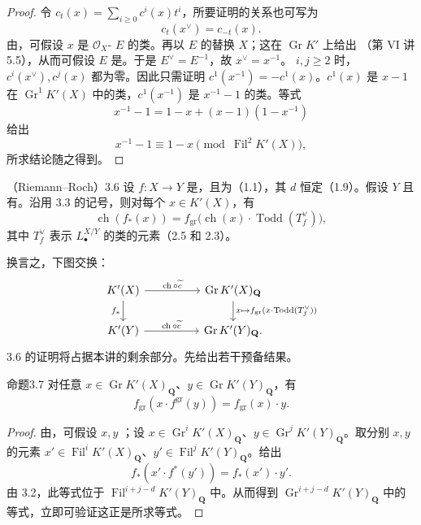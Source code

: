 \begin{proof}
令 $c_t(x)=\sum_{i\geq0}c^i(x)t^i$，所要证明的关系也可写为
\[c_t(x^\vee)=c_{-t}(x).\]
由，可假设 $x$ 是 $\mathscr O_X$- $E$ 的类。再以 $E$ 的替换 $X$；这在 $\operatorname{Gr}K'$ 上给出
（第 VI 讲 5.5），从而可假设 $E$ 是。于是 $E^\vee=E^{-1}$，故 $x^\vee=x^{-1}$。
$i,j\geq2$ 时，$c^i(x^\vee),c^j(x)$ 都为零。因此只需证明 $c^1(x^{-1})=-c^1(x)$。$c^1(x)$ 是 $x-1$ 在 $\operatorname{Gr}^1K'(X)$ 中的类，$c^1(x^{-1})$ 是 $x^{-1}-1$ 的类。等式
\[x^{-1}-1=1-x+(x-1)(1-x^{-1})\]
给出
\[x^{-1}-1\equiv1-x\pmod{\operatorname{Fil}^2K'(X)},\]
所求结论随之得到。
\end{proof}
\begin{SGAresult}{（Riemann--Roch）}{3.6}
设 $f:X\to Y$ 是，且为（1.1），其 $d$ 恒定（1.9）。假设 $Y$ 且有。沿用 3.3 的记号，则对每个 $x\in K'(X)$，有
\[\operatorname{ch}(f_*(x))=f_{\mathrm{gr}}\bigl(\operatorname{ch}(x)\cdot\operatorname{Todd}(T_f^\vee)\bigr),\]
其中 $T_f^\vee$ 表示 $L^{X/Y}_\bullet$ 的类的元素（2.5 和 2.3）。
\end{SGAresult}
换言之，下图交换：
\[
\begin{tikzcd}[column sep=huge]
K'(X)\arrow[r,"\operatorname{ch}\circ\widetilde c"]\arrow[d,"f_*"']&\operatorname{Gr}K'(X)_{\mathbf Q}\arrow[d,"{x\mapsto f_{\mathrm{gr}}(x\cdot\operatorname{Todd}(T_f^\vee))}"]\\
K'(Y)\arrow[r,"\operatorname{ch}\circ\widetilde c"]&\operatorname{Gr}K'(Y)_{\mathbf Q}.
\end{tikzcd}
\]
 3.6 的证明将占据本讲的剩余部分。先给出若干预备结果。
\begin{SGAresult}{命题}{3.7}
对任意 $x\in\operatorname{Gr}K'(X)_{\mathbf Q}$、$y\in\operatorname{Gr}K'(Y)_{\mathbf Q}$，有
\[f_{\mathrm{gr}}(x\cdot f^{\mathrm{gr}}(y))=f_{\mathrm{gr}}(x)\cdot y.\]
\end{SGAresult}
\begin{proof}
由，可假设 $x,y$ ；设 $x\in\operatorname{Gr}^iK'(X)_{\mathbf Q}$、$y\in\operatorname{Gr}^jK'(Y)_{\mathbf Q}$。取分别 $x,y$ 的元素 $x'\in\operatorname{Fil}^iK'(X)_{\mathbf Q}$、$y'\in\operatorname{Fil}^jK'(Y)_{\mathbf Q}$。给出
\[f_*(x'\cdot f^*(y'))=f_*(x')\cdot y'.\]
由 3.2，此等式位于 $\operatorname{Fil}^{i+j-d}K'(Y)_{\mathbf Q}$ 中。从而得到 $\operatorname{Gr}^{i+j-d}K'(Y)_{\mathbf Q}$ 中的等式，立即可验证这正是所求等式。
\end{proof}
